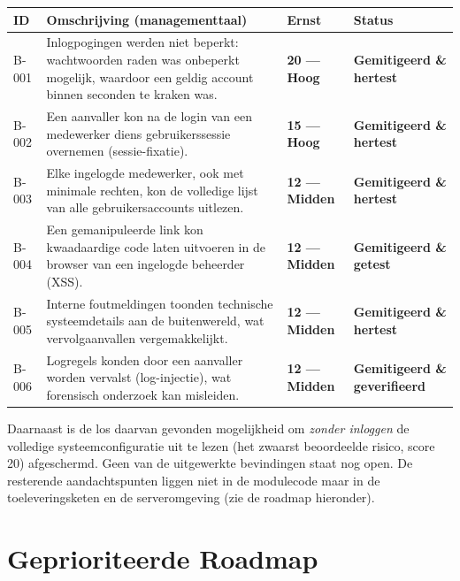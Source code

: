 \documentclass[12pt, a4paper]{report}
\newcommand{\rood}[1]{\textcolor{avansRed}{\textbf{#1}}}
\newcommand{\amber}[1]{\textcolor{ragAmber}{\textbf{#1}}}
\newcommand{\groen}[1]{\textcolor{ragGreen}{\textbf{#1}}}
\begin{document}
{\small
\begin{tabularx}{\textwidth}{@{}l X l l@{}}
    \toprule
    \textbf{ID} & \textbf{Omschrijving (managementtaal)} & \textbf{Ernst} & \textbf{Status} \\
    \midrule
    B-001 & Inlogpogingen werden niet beperkt: wachtwoorden raden was onbeperkt
            mogelijk, waardoor een geldig account binnen seconden te kraken was. &
            \rood{20 --- Hoog} & \groen{Gemitigeerd \& hertest} \\
    \addlinespace
    B-002 & Een aanvaller kon na de login van een medewerker diens
            gebruikerssessie overnemen (sessie-fixatie). &
            \rood{15 --- Hoog} & \groen{Gemitigeerd \& hertest} \\
    \addlinespace
    B-003 & Elke ingelogde medewerker, ook met minimale rechten, kon de volledige
            lijst van alle gebruikersaccounts uitlezen. &
            \amber{12 --- Midden} & \groen{Gemitigeerd \& hertest} \\
    \addlinespace
    B-004 & Een gemanipuleerde link kon kwaadaardige code laten uitvoeren in de
            browser van een ingelogde beheerder (XSS). & \amber{12 --- Midden} &
            \groen{Gemitigeerd \& getest} \\
    \addlinespace
    B-005 & Interne foutmeldingen toonden technische systeemdetails aan de
            buitenwereld, wat vervolgaanvallen vergemakkelijkt. &
            \amber{12 --- Midden} & \groen{Gemitigeerd \& hertest} \\
    \addlinespace
    B-006 & Logregels konden door een aanvaller worden vervalst
            (log-injectie), wat forensisch onderzoek kan misleiden. &
            \amber{12 --- Midden} & \groen{Gemitigeerd \& geverifieerd} \\
    \bottomrule
\end{tabularx}
}

\vspace{0.4em}
\noindent Daarnaast is de los daarvan gevonden mogelijkheid om \emph{zonder
inloggen} de volledige systeemconfiguratie uit te lezen (het zwaarst beoordeelde
risico, score 20) afgeschermd. Geen van de uitgewerkte bevindingen staat nog
open. De resterende aandachtspunten liggen niet in de modulecode maar in de
toeleveringsketen en de serveromgeving (zie de roadmap hieronder).

\section{Geprioriteerde Roadmap}
\label{sec:roadmap}
\end{document}
